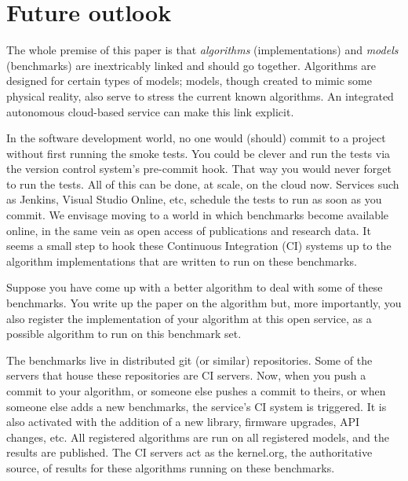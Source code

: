 \documentclass[conference]{IEEEtran}
\begin{document}
\section{Future outlook}




The whole premise of this paper is that {\emph{algorithms}}
(implementations) and {\emph{models}} (benchmarks) are inextricably
linked and should go together. Algorithms are designed for certain
types of models; models, though created to mimic some physical
reality, also serve to stress the current known algorithms. An
integrated autonomous cloud-based service can make this link explicit.

In the software development world, no one would (should) commit to a
project without first running the smoke tests. You could be clever and
run the tests via the version control system's pre-commit hook. That
way you would never forget to run the tests. All of this can be done,
at scale, on the cloud now. Services such as Jenkins, Visual Studio
Online, etc, schedule the tests to run as soon as you commit. We
envisage moving to a world in which benchmarks become available
online, in the same vein as open access of publications and research
data. It seems a small step to hook these Continuous Integration (CI)
systems up to the algorithm implementations that are written to run on
these benchmarks.

Suppose you have come up with a better algorithm to deal with some of
these benchmarks. You write up the paper on the algorithm but, more
importantly, you also register the implementation of your algorithm at
this open service, as a possible algorithm to run on this benchmark
set.

The benchmarks live in distributed git (or similar) repositories. Some
of the servers that house these repositories are CI servers. Now, when
you push a commit to your algorithm, or someone else pushes a commit
to theirs, or when someone else adds a new benchmarks, the service's
CI system is triggered. It is also activated with the addition of a
new library, firmware upgrades, API changes, etc. All registered
algorithms are run on all registered models, and the results are
published. The CI servers act as the kernel.org, the authoritative
source, of results for these algorithms running on these benchmarks.
\end{document}
